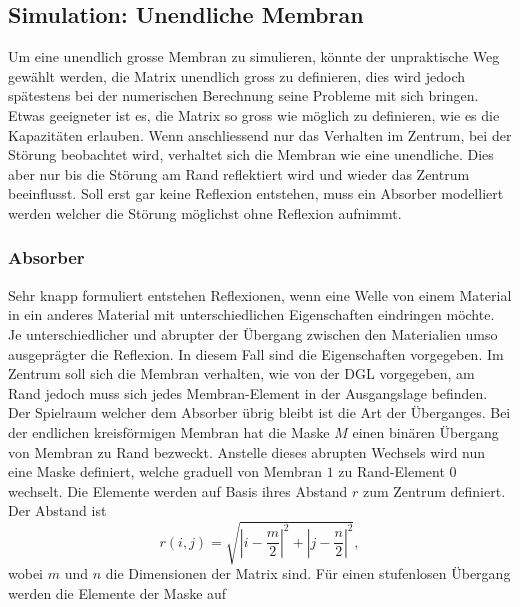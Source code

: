 \subsection{Simulation: Unendliche Membran}

Um eine unendlich grosse Membran zu simulieren, könnte der unpraktische Weg gewählt werden, die Matrix unendlich gross zu definieren, dies wird jedoch spätestens bei der numerischen Berechnung seine Probleme mit sich bringen.
Etwas geeigneter ist es, die Matrix so gross wie möglich zu definieren, wie es die Kapazitäten erlauben.
Wenn anschliessend nur das Verhalten im Zentrum, bei der Störung beobachtet wird, verhaltet sich die Membran wie eine unendliche. 
Dies aber nur bis die Störung am Rand reflektiert wird und wieder das Zentrum beeinflusst.
Soll erst gar keine Reflexion entstehen, muss ein Absorber modelliert werden welcher die Störung möglichst ohne Reflexion aufnimmt.

\subsubsection{Absorber}
Sehr knapp formuliert entstehen Reflexionen, wenn eine Welle von einem Material in ein anderes Material mit unterschiedlichen Eigenschaften eindringen möchte.
Je unterschiedlicher und abrupter der Übergang zwischen den Materialien umso ausgeprägter die Reflexion.
In diesem Fall sind die Eigenschaften vorgegeben.
Im Zentrum soll sich die Membran verhalten, wie von der DGL vorgegeben, am Rand jedoch muss sich jedes Membran-Element in der Ausgangslage befinden. 
Der Spielraum welcher dem Absorber übrig bleibt ist die Art der Überganges.
Bei der endlichen kreisförmigen Membran hat die Maske $M$ einen binären Übergang von Membran zu Rand bezweckt.
Anstelle dieses abrupten Wechsels wird nun eine Maske definiert, welche graduell von Membran $1$ zu Rand-Element $0$ wechselt.
Die Elemente werden auf Basis ihres Abstand $r$ zum Zentrum definiert. 
Der Abstand ist 
\begin{equation*}
	r(i,j) = \sqrt{|i-\frac{m}{2}|^2+|j-\frac{n}{2}|^2},
\end{equation*} 
wobei $ m $ und $n$ die Dimensionen der Matrix sind.
Für einen stufenlosen Übergang werden die Elemente der Maske auf 

